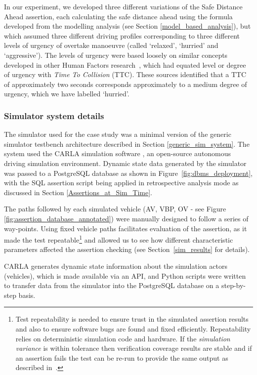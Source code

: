 In our experiment, we developed three different variations of the Safe Distance Ahead assertion, each calculating the safe distance ahead using the formula developed from the modelling analysis (see Section \ref{model_based_analysis}), but which assumed three different driving profiles corresponding to three different levels of urgency of overtake manoeuvre (called `relaxed', `hurried' and `aggressive'). The levels of urgency were based loosely on similar concepts developed in other Human Factors research~\cite{Chen2015}, which had equated level or degree of urgency with \emph{Time To Collision} (TTC). These sources identified that a TTC of approximately two seconds corresponds approximately to a medium degree of urgency, which we have labelled `hurried'.  

\subsubsection{Simulator system details}

The simulator used for the case study was a minimal version of the generic simulator testbench architecture described in Section \ref{generic_sim_system}. The system used the CARLA simulation software \cite{CarlaSimulator}, an open-source autonomous driving simulation environment. Dynamic state data generated by the simulator was passed to a PostgreSQL database as shown in Figure~\ref{fig:dbms_deployment}, with the SQL assertion script being applied in retrospective analysis mode as discussed in Section \ref{Assertions_at_Sim_Time}.

The paths followed by each simulated vehicle (AV, VBP, OV - see Figure \ref{fig:assertion_database_annotated}) were manually designed to follow a series of way-points. Using fixed vehicle paths facilitates evaluation of the assertion, as it made the test repeatable\footnote{Test repeatability is needed to ensure trust in the simulated assertion results and also to ensure software bugs are found and fixed efficiently. Repeatability relies on deterministic simulation code and hardware. If the \emph{simulation variance} is within tolerance then verification coverage results are stable and if an assertion fails the test can be re-run to provide the same output as described in~\cite{chance2021}.} and allowed us to see how different characteristic parameters affected the assertion checking (see Section~\ref{sim_results} for details). 


CARLA generates dynamic state information about the simulation actors (vehicles), which is made available via an API, and Python scripts were written to transfer data from the simulator into the PostgreSQL database on a step-by-step basis.


